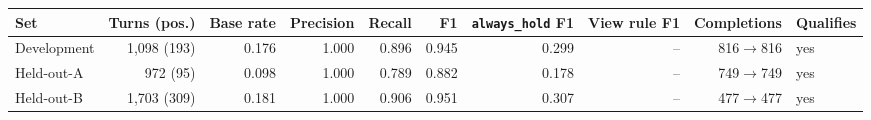 \begin{tabular}{lrrrrrrrrl}
\toprule
Set & Turns (pos.) & Base rate & Precision & Recall & F1 & \texttt{always\_hold} F1 & View rule F1 & Completions & Qualifies \\
\midrule
Development & 1{,}098 (193) & 0.176 & 1.000 & 0.896 & 0.945 & 0.299 & -- & 816$\to$816 & yes \\
Held-out-A & 972 (95) & 0.098 & 1.000 & 0.789 & 0.882 & 0.178 & -- & 749$\to$749 & yes \\
Held-out-B & 1{,}703 (309) & 0.181 & 1.000 & 0.906 & 0.951 & 0.307 & -- & 477$\to$477 & yes \\
\bottomrule
\end{tabular}
